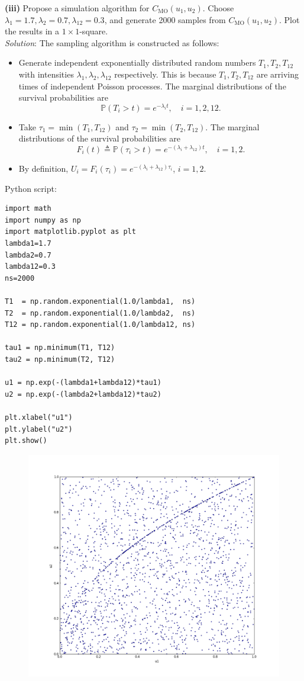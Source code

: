 \documentclass[paper=a4, fontsize=11pt]{scrartcl} %
\numberwithin{equation}{section} %
\numberwithin{figure}{section} %
\numberwithin{table}{section} %
\begin{document}
\textbf{(iii)} Propose a simulation algorithm for $C_{\text{MO}}(u_1,u_2)$. Choose
$\lambda_1 = 1.7, \lambda_2 = 0.7, \lambda_{12} = 0.3$, and generate 2000 samples from
$C_{\text{MO}}(u_1,u_2)$. Plot the results in a $1\times 1$-square.\\
\textit{Solution}: The sampling algorithm is constructed as follows:
\begin{itemize}[noitemsep]
\item Generate independent exponentially distributed random numbers $T_1, T_2, T_{12}$ with intensities $\lambda_1, \lambda_2, \lambda_{12}$
respectively. This is because $T_1, T_2, T_{12}$ are arriving times of independent Poisson processes. The marginal 
distributions of the survival probabilities are
$$
\mathbb{P}(T_i>t) = e^{-\lambda_i t}, \quad i=1,2,12.
$$
\item Take $\tau_1=\min(T_1,T_{12})$ and $\tau_2 = \min(T_2,T_{12})$. The marginal distributions of the survival probabilities are
$$
F_i(t)\triangleq \mathbb{P}(\tau_i>t) = e^{-(\lambda_i + \lambda_{12}) t}, \quad i=1,2.
$$
\item By definition, $U_i = F_i(\tau_i) = e^{-(\lambda_i + \lambda_{12}) \tau_i}$, $i=1,2$.\\
\end{itemize}
Python script:
\begin{lstlisting}
import math
import numpy as np
import matplotlib.pyplot as plt
lambda1=1.7
lambda2=0.7
lambda12=0.3
ns=2000

T1  = np.random.exponential(1.0/lambda1,  ns)
T2  = np.random.exponential(1.0/lambda2,  ns)
T12 = np.random.exponential(1.0/lambda12, ns)

tau1 = np.minimum(T1, T12)
tau2 = np.minimum(T2, T12)

u1 = np.exp(-(lambda1+lambda12)*tau1)
u2 = np.exp(-(lambda2+lambda12)*tau2)

plt.xlabel("u1")
plt.ylabel("u2")
plt.show()
\end{lstlisting}
\begin{figure}[h]\label{survival}
\includegraphics[width=14cm]{mo}
\end{figure}
\end{document}
